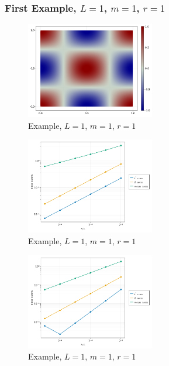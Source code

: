 \subsubsection{First Example, $L=1$, $m=1$, $r=1$}%
\label{sub:first_example}

\begin{figure}[tbh!]
    \centering
    \includegraphics[width=0.5\textwidth]{figures/model/l_1.0_m_1_r_1n_100_sol.png}
    \caption{Example, $L=1$, $m=1$, $r=1$}
    \label{fig:sol_l1_m1_r1}
\end{figure}

\begin{figure}[tbh!]
    \centering
    \includegraphics[width=0.5\textwidth]{figures/convergence/L_1.0_m_1_r_1/conv_order_2_gamma_9.0.png}
    \caption{Example, $L=1$, $m=1$, $r=1$}
    \label{fig:ex1_sol_conv_order_2}
\end{figure}



\begin{figure}[tbh!]
    \centering
    \includegraphics[width=0.5\textwidth]{figures/convergence/L_1.0_m_1_r_1/conv_order_3_gamma_18.0.png}
    \caption{Example, $L=1$, $m=1$, $r=1$}
    \label{fig:ex1_sol_conv_order_2}
\end{figure}

